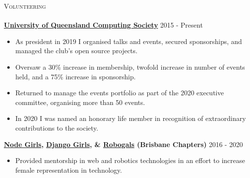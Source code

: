 \documentclass[a4paper]{article}
\newcommand{\lineunder} {
    \vspace*{-8pt} \\
    \hspace*{-10pt} \hrulefill \\
}
\newcommand{\header} [1] {
    {\hspace*{-10pt}\vspace*{6pt} \textsc{#1}}
    \vspace*{-6pt} \lineunder
}
\newenvironment{singleitem}
{   \small
    \vspace{0pt}
    \begin{itemize}
    \setlength{\itemsep}{0pt}
    \setlength{\parskip}{0pt}
    \setlength{\parsep}{0pt}   }
{\end{itemize} \vspace{1pt}	}
\begin{document}
\vspace{0mm}

\header{Volunteering}
\textbf{\href{https://uqcs.org}{University of Queensland Computing Society}} \hfill 2015 - Present\\
\begin{singleitem}
	\item As president in 2019 I organised talks and events, secured sponsorships, and managed the club's open source projects.
	\item Oversaw a 30\% increase in membership, twofold increase in number of events held, and a 75\% increase in sponsorship.
	\item Returned to manage the events portfolio as part of the 2020 executive committee, organising more than 50 events.
	\item In 2020 I was named an honorary life member in recognition of extraordinary contributions to the society.
\end{singleitem}
\textbf{\href{https://www.nodegirls.com/}{Node Girls}, \href{https://djangogirls.org/}{Django Girls}, \& \href{https://robogalsbrisbane.org/}{Robogals} (Brisbane Chapters)} \hfill 2016 - 2020\\
\begin{singleitem}
	\item Provided mentorship in web and robotics technologies in an effort to increase female representation in technology.
\end{singleitem}

\vspace{0mm}
\end{document}
